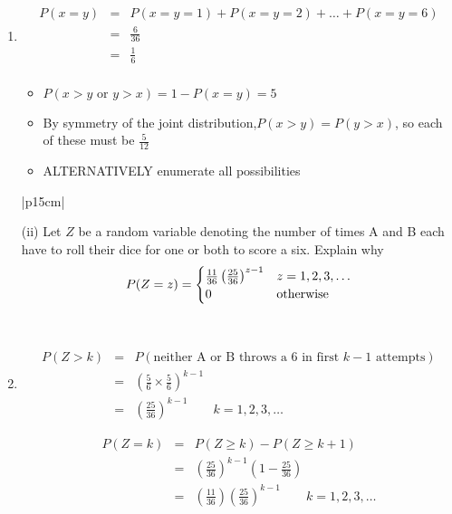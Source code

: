 \documentclass[a4paper,12pt]{article}
\begin{document}
\begin{enumerate}
    \item 
    
\begin{eqnarray*}
P(x = y) &=& P(x = y = 1) + P(x = y = 2) + \ldots + P(x = y = 6)\\ 
&=& \frac{6}{36}\\
&=& \frac{1}{6}\\
\end{eqnarray*}

\begin{itemize}
    \item $P(x > y \mbox{ or }y > x) = 1 - P(x = y) = 5$
\item By symmetry of the joint distribution,$P(x > y) = P(y > x)$, so each of these must be $ \frac{5}{12}$
\item ALTERNATIVELY enumerate all possibilities
\end{itemize}
\newpage

    
  \begin{table}[ht!]
     \centering
     \begin{tabular}{|p{15cm}|}
     \hline  
     \large
     
(ii) Let $Z$ be a random variable denoting the number of times A and B each have to roll their dice for one or both to score a six.  Explain why 
{ 
\large
\[   P(Z=z) = \begin{cases}  { \Large \frac{11}{36} \left( \frac{25}{36} \right)^{z-1} } & z= 1,2,3,\ldots \\
0 & \mbox{otherwise} \end{cases}\]
}
 
 \\ \hline 
      \end{tabular}
    \end{table}
    
\item 
\begin{eqnarray*}
P(Z > k) &=& P(\mbox{neither A or B throws a 6 in first $k - 1$ attempts})\\
&=& \left(\frac{5}{6} \times \frac{5}{6} \right)^{k-1} \\
&=& \left(\frac{25}{36} \right)^{k-1} \qquad k = 1, 2, 3, \ldots
\end{eqnarray*}

\begin{eqnarray*}
P(Z = k) &=& P(Z \geq k) - P(Z \geq k + 1)\\
&=& \left( \frac{25}{36} \right)^{k-1} \left(1 -   \frac{25}{36} \right) \\
&=& \left( \frac{11}{36} \right)\left( \frac{25}{36} \right)^{k-1} \qquad k = 1, 2, 3, \ldots
\end{eqnarray*}


\end{enumerate}
\end{document}
